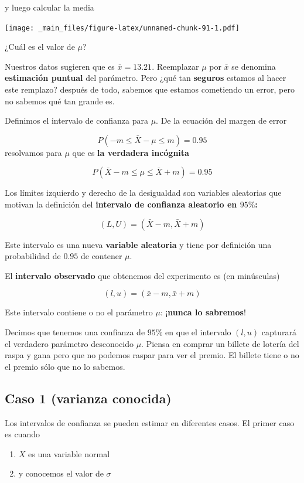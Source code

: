 \documentclass[
]{book}
\providecommand{\tightlist}{%
  \setlength{\itemsep}{0pt}\setlength{\parskip}{0pt}}
\begin{document}
y luego calcular la media

\texttt{[image: \_main\_files/figure-latex/unnamed-chunk-91-1.pdf]}

¿Cuál es el valor de \(\mu\)?

Nuestros datos sugieren que es \(\bar{x}=13.21\). Reemplazar \(\mu\) por \(\bar{x}\) se denomina \textbf{estimación puntual} del parámetro. Pero ¿qué tan \textbf{seguros} estamos al hacer este remplazo? después de todo, sabemos que estamos cometiendo un error, pero no sabemos qué tan grande es.

Definimos el intervalo de confianza para \(\mu\). De la ecuación del margen de error

\[P(-m \leq \bar{X} - \mu \leq m)=0.95\]
resolvamos para \(\mu\) que es \textbf{la verdadera incógnita}

\[P(\bar{X} - m \leq \mu \leq \bar{X} + m)=0.95\]

Los límites izquierdo y derecho de la desigualdad son variables aleatorias que motivan la definición del \textbf{intervalo de confianza aleatorio en \(95\%\):}

\[(L,U)=(\bar{X} - m,\bar{X} + m)\]

Este intervalo es una nueva \textbf{variable aleatoria} y tiene por definición una probabilidad de \(0.95\) de contener \(\mu\).

El \textbf{intervalo observado} que obtenemos del experimento es (en minúsculas)

\[(l,u)=(\bar{x} - m,\bar{x} + m)\]

Este intervalo contiene o no el parámetro \(\mu\): ¡\textbf{nunca lo sabremos}!

Decimos que tenemos una confianza de \(95\%\) en que el intervalo \((l,u)\) capturará el verdadero parámetro desconocido \(\mu\). Piensa en comprar un billete de lotería del raspa y gana pero que no podemos raspar para ver el premio. El billete tiene o no el premio sólo que no lo sabemos.

\hypertarget{caso-1-varianza-conocida}{%
\subsection{Caso 1 (varianza conocida)}\label{caso-1-varianza-conocida}}

Los intervalos de confianza se pueden estimar en diferentes casos. El primer caso es cuando

\begin{enumerate}
\def\labelenumi{\arabic{enumi}.}
\tightlist
\item
  \(X\) es una variable normal
\item
  y conocemos el valor de \(\sigma\)
\end{enumerate}
\end{document}
